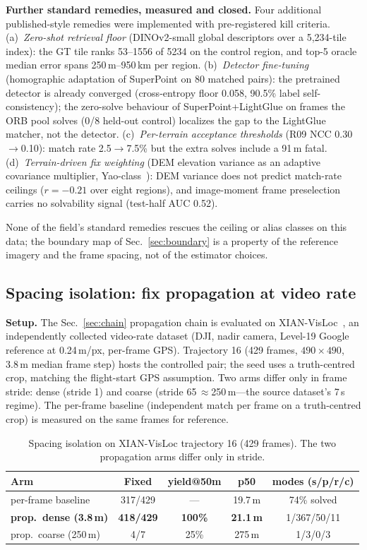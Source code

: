 \documentclass[journal]{IEEEtran}
\begin{document}
\textbf{Further standard remedies, measured and closed.} Four additional published-style remedies were implemented with pre-registered kill criteria. (a)~\emph{Zero-shot retrieval floor} (DINOv2-small global descriptors over a 5{,}234-tile index): the GT tile ranks 53--1556 of 5234 on the control region, and top-5 oracle median error spans 250\,m--950\,km per region. (b)~\emph{Detector fine-tuning} (homographic adaptation of SuperPoint on 80 matched pairs): the pretrained detector is already converged (cross-entropy floor 0.058, 90.5\% label self-consistency); the zero-solve behaviour of SuperPoint+LightGlue on frames the ORB pool solves (0/8 held-out control) localizes the gap to the LightGlue matcher, not the detector. (c)~\emph{Per-terrain acceptance thresholds} (R09 NCC 0.30$\to$0.10): match rate 2.5$\to$7.5\% but the extra solves include a 91\,m fatal. (d)~\emph{Terrain-driven fix weighting} (DEM elevation variance as an adaptive covariance multiplier, Yao-class~\cite{yao2024}): DEM variance does not predict match-rate ceilings ($r=-0.21$ over eight regions), and image-moment frame preselection carries no solvability signal (test-half AUC 0.52).

None of the field's standard remedies rescues the ceiling or alias classes on this data; the boundary map of Sec.~\ref{sec:boundary} is a property of the reference imagery and the frame spacing, not of the estimator choices.

\subsection{Spacing isolation: fix propagation at video rate}
\label{sec:spacing}

\textbf{Setup.} The Sec.~\ref{sec:chain} propagation chain is evaluated on XIAN-VisLoc~\cite{xianvisloc}, an independently collected video-rate dataset (DJI, nadir camera, Level-19 Google reference at 0.24\,m/px, per-frame GPS). Trajectory 16 (429 frames, $490\times490$, 3.8\,m median frame step) hosts the controlled pair; the seed uses a truth-centred crop, matching the flight-start GPS assumption. Two arms differ only in frame stride: dense (stride 1) and coarse (stride 65\,$\approx$250\,m---the source dataset's 7\,s regime). The per-frame baseline (independent match per frame on a truth-centred crop) is measured on the same frames for reference.

\begin{table}[t]
\caption{Spacing isolation on XIAN-VisLoc trajectory 16 (429 frames). The two propagation arms differ only in stride.}
\label{tab:spacing}
\centering
\footnotesize
\begin{tabular}{@{}lcccc@{}}
\toprule
Arm & Fixed & yield@50m & p50 & modes (s/p/r/c) \\
\midrule
per-frame baseline & 317/429 & --- & 19.7\,m & 74\% solved \\
\textbf{prop.\ dense (3.8\,m)} & \textbf{418/429} & \textbf{100\%} & \textbf{21.1\,m} & 1/367/50/11 \\
prop.\ coarse (250\,m) & 4/7 & 25\% & 275\,m & 1/3/0/3 \\
\bottomrule
\end{tabular}
\end{table}
\end{document}
